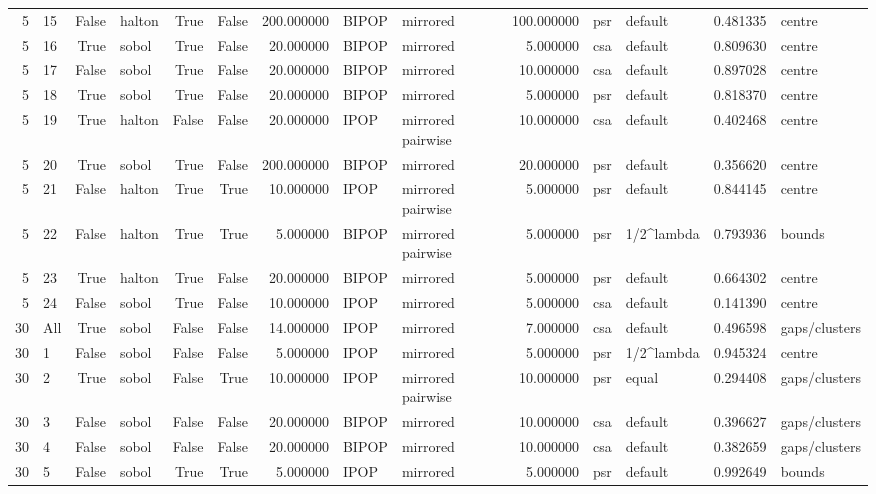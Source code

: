\begin{tabular}{rlrlrrrllrllrl}
5 & 15 & False & halton & True & False & 200.000000 & BIPOP & mirrored & 100.000000 & psr & default & 0.481335 & centre \\
5 & 16 & True & sobol & True & False & 20.000000 & BIPOP & mirrored & 5.000000 & csa & default & 0.809630 & centre \\
5 & 17 & False & sobol & True & False & 20.000000 & BIPOP & mirrored & 10.000000 & csa & default & 0.897028 & centre \\
5 & 18 & True & sobol & True & False & 20.000000 & BIPOP & mirrored & 5.000000 & psr & default & 0.818370 & centre \\
5 & 19 & True & halton & False & False & 20.000000 & IPOP & mirrored pairwise & 10.000000 & csa & default & 0.402468 & centre \\
5 & 20 & True & sobol & True & False & 200.000000 & BIPOP & mirrored & 20.000000 & psr & default & 0.356620 & centre \\
5 & 21 & False & halton & True & True & 10.000000 & IPOP & mirrored pairwise & 5.000000 & psr & default & 0.844145 & centre \\
5 & 22 & False & halton & True & True & 5.000000 & BIPOP & mirrored pairwise & 5.000000 & psr & 1/2^lambda & 0.793936 & bounds \\
5 & 23 & True & halton & True & False & 20.000000 & BIPOP & mirrored & 5.000000 & psr & default & 0.664302 & centre \\
5 & 24 & False & sobol & True & False & 10.000000 & IPOP & mirrored & 5.000000 & csa & default & 0.141390 & centre \\
30 & All & True & sobol & False & False & 14.000000 & IPOP & mirrored & 7.000000 & csa & default & 0.496598 & gaps/clusters \\
30 & 1 & False & sobol & False & False & 5.000000 & IPOP & mirrored & 5.000000 & psr & 1/2^lambda & 0.945324 & centre \\
30 & 2 & True & sobol & False & True & 10.000000 & IPOP & mirrored pairwise & 10.000000 & psr & equal & 0.294408 & gaps/clusters \\
30 & 3 & False & sobol & False & False & 20.000000 & BIPOP & mirrored & 10.000000 & csa & default & 0.396627 & gaps/clusters \\
30 & 4 & False & sobol & False & False & 20.000000 & BIPOP & mirrored & 10.000000 & csa & default & 0.382659 & gaps/clusters \\
30 & 5 & False & sobol & True & True & 5.000000 & IPOP & mirrored & 5.000000 & psr & default & 0.992649 & bounds \\

\end{tabular}
